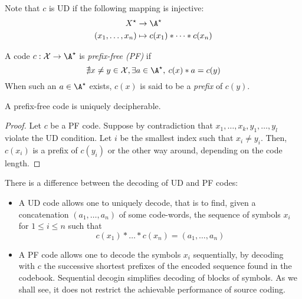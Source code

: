 \documentclass{../cs-classes/cs-classes}
\newcommand*{\X}{\mathcal{X}}
\begin{document}
\begin{remark}
    Note that $c$ is UD if the following mapping is injective:
    \begin{equation*}
        \begin{aligned}
            X^\star&\to\A^\star\\
            (x_1, \dots, x_n)&\mapsto c(x_1) * \dots * c(x_n)
        \end{aligned}
    \end{equation*}
\end{remark}

\begin{definition}
    A code $c: \X\to\A^\star$ is \emph{prefix-free (PF)} if
    \begin{equation*}
        \nexists x\neq y\in \X, \exists a\in\A^\star,\: c(x)*a=c(y)
    \end{equation*} 
    When such an $a\in\A^\star$ exists, $c(x)$ is said to be a \emph{prefix} of $c(y)$.
\end{definition}

\begin{lemma}[PF$\implies$ UD]
    A prefix-free code is uniquely decipherable.
\end{lemma}

\begin{proof}
    Let $c$ be a PF code. Suppose by contradiction that $x_1, \dots, x_k, y_1, \dots, y_l$ violate the UD condition. Let $i$ be the smallest index such that $x_i\neq y_i$. Then, $c(x_i)$ is a prefix of $c(y_i)$ or the other way around, depending on the code length.
\end{proof}

\begin{remark}
    There is a difference between the decoding of UD and PF codes:
    \begin{itemize}
        \item A UD code allows one to uniquely decode, that is to find, given a concatenation $(a_1, \dots, a_n)$ of some code-words, the sequence of symbols $x_i$ for $1\leq i\leq n$ such that
        \begin{equation*}
            c(x_1)*\dots *c(x_n)=(a_1, \dots, a_n)
        \end{equation*} 
        \item A PF code allows one to decode the symbols $x_i$ sequentially, by decoding with $c$ the successive shortest prefixes of the encoded sequence found in the codebook. Sequential decogin simplifies decoding of blocks of symbols. As we shall see, it does not restrict the achievable performance of source coding.
    \end{itemize}
\end{remark}
\end{document}
